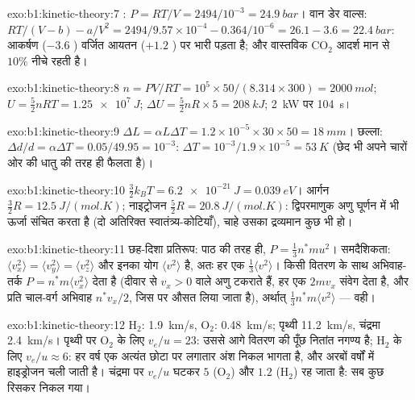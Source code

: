 \begin{solution}{exo:b1:kinetic-theory:7}
: $P = RT/V = 2494/10^{-3} = \qty{24.9}{bar}$। वान डेर वाल्स:
$RT/(V - b) - a/V^2 = 2494/9.57\times10^{-4} - 0.364/10^{-6} = 26.1 - 3.6 =
\qty{22.4}{bar}$: आकर्षण ($-3.6$ ) वर्जित आयतन ($+1.2$ ) पर भारी पड़ता
है; और वास्तविक CO$_2$ आदर्श मान से $10\%$ नीचे रहती है।
\end{solution}

\begin{solution}{exo:b1:kinetic-theory:8}
$n = PV/RT = 10^5 \times 50/(8.314 \times 300) = \qty{2000}{mol}$; $U = \tfrac52
nRT = \qty{1.25e7}{J}$; $\Delta U = \tfrac52 nR \times 5 = \qty{208}{kJ}$;
\qty{2}{kW} पर \qty{104}{s}।
\end{solution}

\begin{solution}{exo:b1:kinetic-theory:9}
$\Delta L = \alpha L\Delta T = 1.2\times10^{-5} \times 30 \times 50 = \qty{18}{mm}$।
छल्ला: $\Delta d/d = \alpha\Delta T = 0.05/49.95 = 10^{-3}$: $\Delta T = 10^{-3}/
1.9\times10^{-5} = \qty{53}{K}$ (छेद भी अपने चारों ओर की धातु की तरह ही फैलता है)।
\end{solution}

\begin{solution}{exo:b1:kinetic-theory:10}
$\tfrac32 k_BT = \qty{6.2e-21}{J} = \qty{0.039}{eV}$। आर्गन $\tfrac32 R =
\qty{12.5}{J/(mol.K)}$; नाइट्रोजन $\tfrac52 R = \qty{20.8}{J/(mol.K)}$:
द्विपरमाणुक अणु घूर्णन में भी ऊर्जा संचित करता है (दो अतिरिक्त
स्वातंत्र्य-कोटियाँ), चाहे उसका द्रव्यमान कुछ भी हो।
\end{solution}

\begin{solution}{exo:b1:kinetic-theory:11}
छह-दिशा प्रतिरूप: पाठ की तरह ही, $P = \tfrac13 n^*mu^2$। समदैशिकता:
$\langle v_x^2\rangle = \langle v_y^2\rangle = \langle v_z^2\rangle$ और इनका
योग $\langle v^2\rangle$ है, अतः हर एक $\tfrac13\langle v^2\rangle$। किसी
वितरण के साथ अभिवाह-तर्क $P = n^*m\langle v_x^2\rangle$ देता है (दीवार से
$v_x > 0$ वाले अणु टकराते हैं, हर एक $2mv_x$ संवेग देता है, और प्रति
चाल-वर्ग अभिवाह $n^*v_x/2$, जिस पर औसत लिया जाता है), अर्थात् $\tfrac13 n^*m\langle v^2\rangle$ --- वही।
\end{solution}

\begin{solution}{exo:b1:kinetic-theory:12}
H$_2$: \qty{1.9}{km/s}, O$_2$: \qty{0.48}{km/s}; पृथ्वी \qty{11.2}{km/s},
चंद्रमा \qty{2.4}{km/s}। पृथ्वी पर O$_2$ के लिए $v_e/u = 23$: उससे आगे
वितरण की पूँछ नितांत नगण्य है; H$_2$ के लिए $v_e/u \approx 6$:
हर वर्ष एक अत्यंत छोटा पर लगातार अंश निकल भागता है, और अरबों वर्षों में
हाइड्रोजन चली जाती है। चंद्रमा पर $v_e/u$ घटकर $5$ (O$_2$) और
$1.2$ (H$_2$) रह जाता है: सब कुछ रिसकर निकल गया।
\end{solution}

